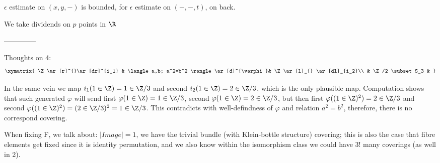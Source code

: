 $\epsilon$ estimate on $(x,y,-)$ is bounded, for $\epsilon$ estimate on $(-,-,t)$, on back. 

We take dividends on $p$ points in $\R$

--------------

Thoughts on 4:
    \[
    \xymatrix{
    \Z \ar[r]^{}\ar[dr]^{i_1} & \langle a,b; a^2=b^2 \rangle \ar[d]^{\varphi}&  \Z \ar[l]_{} \ar[dl]_{i_2}\\
    & \Z/2 \subset S_3 &
    }
    \]
    
    In the same vein we map $i_1(1\in \Z)=1\in \Z/3$ and second $i_2(1\in \Z)=2\in \Z/3$, which is the only plausible map. Computation shows that such generated $\varphi$ will send first $\varphi(1\in \Z)=1 \in \Z/3$, second $\varphi(1\in \Z)=2 \in \Z/3$, but then first $\varphi((1\in \Z)^2)=2 \in \Z/3$ and second $\varphi((1\in \Z)^2)=(2 \in \Z/3)^2=1 \in \Z/3$. This contradicts with well-defindness of $\varphi$ and relation $a^2=b^2$, therefore, there is no correspond covering.
    
    When fixing F, we talk about: $|Image|=1$, we have the trivial bundle (with Klein-bottle structure) covering; this is also the case that fibre elements get fixed since it is identity permutation, and we also know within the isomorphism class we could have $3!$ many coverings (as well in 2).  
    